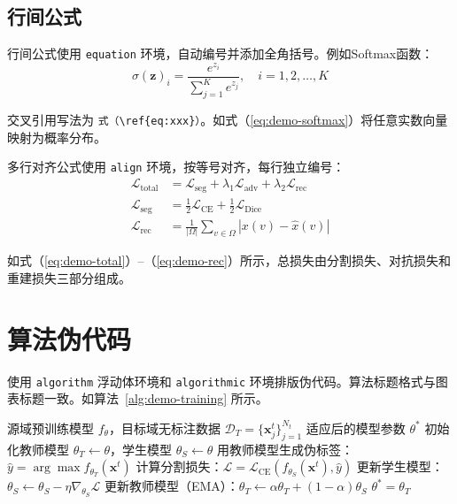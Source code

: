 \subsection{行间公式}\label{subsec:demo-display-eq}

行间公式使用 \verb|equation| 环境，自动编号并添加全角括号。例如Softmax函数：
\begin{equation}\label{eq:demo-softmax}
  \sigma(\mathbf{z})_i = \frac{e^{z_i}}{\sum_{j=1}^{K} e^{z_j}}, \quad i = 1, 2, \ldots, K
\end{equation}

交叉引用写法为 \verb|式（\ref{eq:xxx}）|。如式（\ref{eq:demo-softmax}）将任意实数向量映射为概率分布。

多行对齐公式使用 \verb|align| 环境，按等号对齐，每行独立编号：
\begin{align}
  \mathcal{L}_{\text{total}} &= \mathcal{L}_{\text{seg}} + \lambda_1 \mathcal{L}_{\text{adv}} + \lambda_2 \mathcal{L}_{\text{rec}} \label{eq:demo-total} \\
  \mathcal{L}_{\text{seg}} &= \frac{1}{2} \mathcal{L}_{\text{CE}} + \frac{1}{2} \mathcal{L}_{\text{Dice}} \label{eq:demo-seg} \\
  \mathcal{L}_{\text{rec}} &= \frac{1}{|\Omega|} \sum_{v \in \Omega} |x(v) - \hat{x}(v)| \label{eq:demo-rec}
\end{align}

如式（\ref{eq:demo-total}）--（\ref{eq:demo-rec}）所示，总损失由分割损失、对抗损失和重建损失三部分组成。

\section{算法伪代码}\label{sec:demo-algorithm}

使用 \verb|algorithm| 浮动体环境和 \verb|algorithmic| 环境排版伪代码。算法标题格式与图表标题一致。如算法~\ref{alg:demo-training} 所示。

\begin{algorithm}[htbp]
  \caption{自训练域适应算法}
  \label{alg:demo-training}
  \begin{algorithmic}[1]
    \REQUIRE 源域预训练模型 $f_\theta$，目标域无标注数据 $\mathcal{D}_T = \{\mathbf{x}_j^t\}_{j=1}^{N_t}$
    \ENSURE 适应后的模型参数 $\theta^*$
    \STATE 初始化教师模型 $\theta_T \leftarrow \theta$，学生模型 $\theta_S \leftarrow \theta$
        \STATE 用教师模型生成伪标签：$\hat{y} = \arg\max f_{\theta_T}(\mathbf{x}^t)$
        \STATE 计算分割损失：$\mathcal{L} = \mathcal{L}_{\text{CE}}(f_{\theta_S}(\mathbf{x}^t), \hat{y})$
        \STATE 更新学生模型：$\theta_S \leftarrow \theta_S - \eta \nabla_{\theta_S} \mathcal{L}$
        \STATE 更新教师模型（EMA）：$\theta_T \leftarrow \alpha \theta_T + (1-\alpha) \theta_S$
      \ENDFOR
    \ENDFOR
    \RETURN $\theta^* = \theta_T$
  \end{algorithmic}
\end{algorithm}

